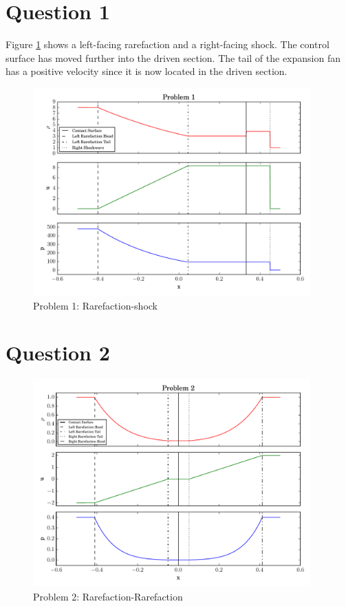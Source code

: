 \documentclass[letterpaper,12pt,]{article}
\begin{document}


\section*{Question 1}

Figure \ref{fig:q1} shows a left-facing rarefaction and a right-facing shock. The control surface has moved further into the driven section. The tail of the expansion fan has a positive velocity since it is now located in the driven section.

\begin{figure}[!ht]
    \centering
    \includegraphics[width = 0.95\textwidth]{p1.pdf}
    \caption {Problem 1: Rarefaction-shock}
    \label{fig:q1}
\end{figure}

\section*{Question 2}

\begin{figure}[!ht]
    \centering
    \includegraphics[width = 0.95\textwidth]{p2.pdf}
    \caption {Problem 2: Rarefaction-Rarefaction}
    \label{fig:q2}
\end{figure}
\end{document}
